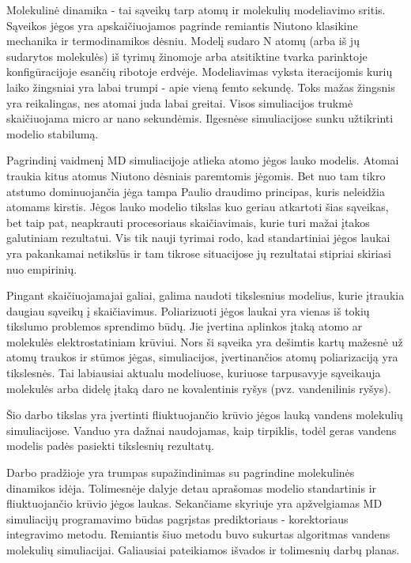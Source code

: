 Molekulinė dinamika - tai sąveikų tarp atomų ir molekulių modeliavimo sritis.
Sąveikos jėgos yra apskaičiuojamos pagrinde remiantis Niutono klasikine mechanika ir termodinamikos dėsniu.
Modelį sudaro N atomų (arba iš jų sudarytos molekulės) iš tyrimų žinomoje arba atsitiktine tvarka parinktoje konfigūracijoje esančių ribotoje erdvėje.
Modeliavimas vyksta iteracijomis kurių laiko žingsniai yra labai trumpi - apie vieną femto sekundę.
Toks mažas žingsnis yra reikalingas, nes atomai juda labai greitai.
Visos simuliacijos trukmė skaičiuojama micro ar nano sekundėmis.
Ilgesnėse simuliacijose sunku užtikrinti modelio stabilumą.

Pagrindinį vaidmenį MD simuliacijoje atlieka atomo jėgos lauko modelis.
Atomai traukia kitus atomus Niutono dėsniais paremtomis jėgomis.
Bet nuo tam tikro atstumo dominuojančia jėga tampa Paulio draudimo principas, kuris neleidžia atomams kirstis.
Jėgos lauko modelio tikslas kuo geriau atkartoti šias sąveikas, bet taip pat, neapkrauti procesoriaus skaičiavimais, kurie turi mažai įtakos galutiniam rezultatui.
Vis tik nauji tyrimai rodo, kad standartiniai jėgos laukai yra pakankamai netikslūs ir tam tikrose situacijose jų rezultatai stipriai skiriasi nuo empirinių.

Pingant skaičiuojamajai galiai, galima naudoti tikslesnius modelius, kurie įtraukia daugiau sąveikų į skaičiavimus.
Poliarizuoti jėgos laukai yra vienas iš tokių tikslumo problemos sprendimo būdų.
Jie įvertina aplinkos įtaką atomo ar molekulės elektrostatiniam krūviui.
Nors ši sąveika yra dešimtis kartų mažesnė už atomų traukos ir stūmos jėgas, simuliacijos, įvertinančios atomų poliarizaciją yra tikslesnės.
Tai labiausiai aktualu modeliuose, kuriuose tarpusavyje sąveikauja molekulės arba didelę įtaką daro ne kovalentinis ryšys (pvz. vandenilinis ryšys).

Šio darbo tikslas yra įvertinti fliuktuojančio krūvio jėgos lauką vandens molekulių simuliacijose.
Vanduo yra dažnai naudojamas, kaip tirpiklis, todėl geras vandens modelis padės pasiekti tikslesnių rezultatų.

Darbo pradžioje yra trumpas supažindinimas su pagrindine molekulinės dinamikos idėja.
Tolimesnėje dalyje detau aprašomas modelio standartinis ir fliuktuojančio krūvio jėgos laukas.
Sekančiame skyriuje yra apžvelgiamas MD simuliacijų programavimo būdas pagrįstas prediktoriaus - korektoriaus integravimo metodu.
Remiantis šiuo metodu buvo sukurtas algoritmas vandens molekulių simuliacijai.
Galiausiai pateikiamos išvados ir tolimesnių darbų planas.
